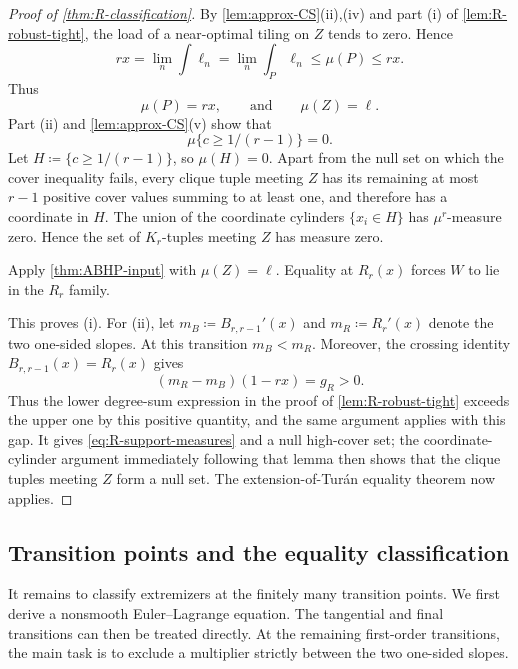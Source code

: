 \documentclass[10pt]{article}
\numberwithin{equation}{section}
\begin{document}
\begin{proof}[Proof of \cref{thm:R-classification}]
By \cref{lem:approx-CS}(ii),(iv) and part \textup{(i)} of \cref{lem:R-robust-tight}, the load of a near-optimal tiling on $Z$ tends to zero.  Hence
\[
 rx=\lim_n\int\ell_n
 =\lim_n\int_P\ell_n\le\mu(P)\le rx.
\]
Thus
\begin{equation}\label{eq:R-support-measures}
 \mu(P)=rx,
 \qquad\text{and}\qquad
 \mu(Z)=\ell.
\end{equation}
Part \textup{(ii)} and \cref{lem:approx-CS}(v) show that
\[
 \mu\{c\ge1/(r-1)\}=0.
\]
Let $H\coloneqq\{c\ge1/(r-1)\}$, so $\mu(H)=0$.  Apart from the null set on which the cover inequality fails, every clique tuple meeting $Z$ has its remaining at most $r-1$ positive cover values summing to at least one, and therefore has a coordinate in $H$.  The union of the coordinate cylinders $\{x_i\in H\}$ has $\mu^r$-measure zero.  Hence the set of $K_r$-tuples meeting $Z$ has measure zero.

Apply \cref{thm:ABHP-input} with $\mu(Z)=\ell$.  Equality at $R_r(x)$ forces $W$ to lie in the $R_r$ family.

This proves \textup{(i)}.  For \textup{(ii)}, let $m_B\coloneqq B_{r,r-1}'(x)$ and $m_R\coloneqq R_r'(x)$ denote the two one-sided slopes.  At this transition $m_B<m_R$.  Moreover, the crossing identity $B_{r,r-1}(x)=R_r(x)$ gives
\[
 (m_R-m_B)(1-rx)=g_R>0.
\]
Thus the lower degree-sum expression in the proof of \cref{lem:R-robust-tight} exceeds the upper one by this positive quantity, and the same argument applies with this gap.  It gives \cref{eq:R-support-measures} and a null high-cover set; the coordinate-cylinder argument immediately following that lemma then shows that the clique tuples meeting $Z$ form a null set.  The extension-of-Tur\'an equality theorem now applies.
\end{proof}

\subsection{Transition points and the equality classification}\label{sec:transitions}

It remains to classify extremizers at the finitely many transition points.  We first derive a nonsmooth Euler--Lagrange equation.  The tangential and final transitions can then be treated directly.  At the remaining first-order transitions, the main task is to exclude a multiplier strictly between the two one-sided slopes.
\end{document}

